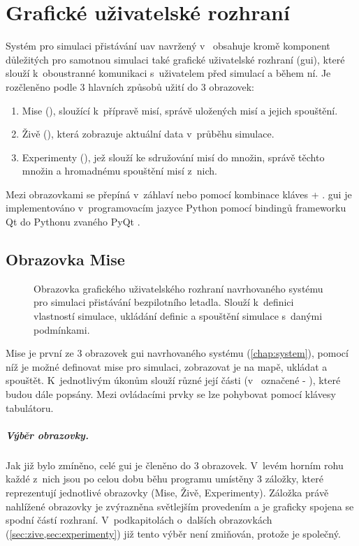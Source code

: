 \chapter{Grafické uživatelské rozhraní} \label{chap:gui}
    Systém pro simulaci přistávání \acrshort{uav} navržený v~ obsahuje kromě komponent důležitých pro samotnou simulaci také grafické uživatelské rozhraní (\acrshort{gui}), které slouží k~oboustranné komunikaci s~uživatelem před simulací a během ní. Je rozčleněno podle 3 hlavních způsobů užití do 3 obrazovek:
    \begin{enumerate}
        \item Mise (), sloužící k~přípravě misí, správě uložených misí a jejich spouštění.
        \item Živě (), která zobrazuje aktuální data v~průběhu simulace.
        \item Experimenty (), jež slouží ke sdružování misí do množin, správě těchto množin a hromadnému spouštění misí z~nich.
    \end{enumerate}
    Mezi obrazovkami se přepíná v~záhlaví nebo pomocí kombinace kláves \Ctrl + \Tab. \acrshort{gui} je implementováno v~programovacím jazyce Python pomocí bindingů frameworku Qt do Pythonu zvaného PyQt \cite{pyqt}.
    \section{Obrazovka Mise} \label{sec:mise}
    \begin{figure}
        \centering
        
        \caption[GUI: Obrazovka ]{Obrazovka  grafického uživatelského rozhraní navrhovaného systému pro simulaci přistávání bezpilotního letadla. Slouží k~definici vlastností simulace, ukládání definic a spouštění simulace s~danými podmínkami.}
        \label{fig:tabMise}
    \end{figure}
    Mise je první ze 3 obrazovek \acrshort{gui} navrhovaného systému (\cref{chap:system}), pomocí níž je možné definovat mise pro simulaci, zobrazovat je na mapě, ukládat a spouštět. K~jednotlivým úkonům slouží různé její části (v~ označené  - ), které budou dále popsány. Mezi ovládacími prvky se lze pohybovat pomocí klávesy tabulátoru.
    \paragraph{ Výběr obrazovky.}Jak již bylo zmíněno, celé \acrshort{gui} je členěno do 3 obrazovek. V~levém horním rohu každé z~nich jsou po celou dobu běhu programu umístěny 3 záložky, které reprezentují jednotlivé obrazovky (Mise, Živě, Experimenty). Záložka právě nahlížené obrazovky je zvýrazněna světlejším provedením a je graficky spojena se spodní částí rozhraní. V~podkapitolách o~dalších obrazovkách (\cref*{sec:zive,sec:experimenty}) již tento výběr není zmiňován, protože je společný.

